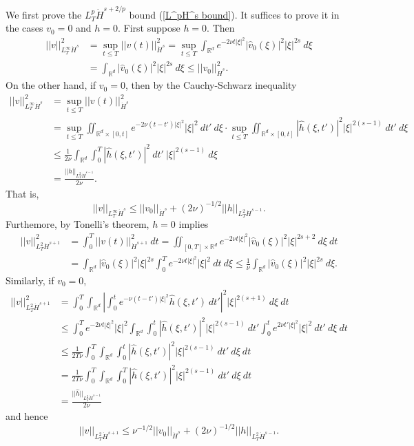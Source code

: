 \documentclass[10pt]{article}
\newcommand{\RR}{\mathbb{R}}
\theoremstyle{definition}
\begin{document}
We first prove the $L^p_T \dot H^{s + 2/p}$ bound (\ref{L^pH^s bound}).
It suffices to prove it in the cases $v_0 = 0$ and $h = 0$.
First suppose $h = 0$. Then
\begin{align*}
||v||_{L^\infty_T \dot H^s}^2 &= \sup_{t \leq T} ||v(t)||_{\dot H^s}^2 = \sup_{t \leq T} \int_{\RR^d} e^{-2\nu t|\xi|^2} |\hat v_0(\xi)|^2 |\xi|^{2s} ~d\xi\\
&= \int_{\RR^d} |\hat v_0(\xi)|^2 |\xi|^{2s} ~d\xi \leq ||v_0||_{\dot H^s}^2.
\end{align*}
On the other hand, if $v_0 = 0$, then by the Cauchy-Schwarz inequality
\begin{align*}
||v||_{L^\infty_T \dot H^s}^2 &= \sup_{t \leq T} ||v(t)||_{\dot H^s}^2\\
&= \sup_{t \leq T} \iint_{\RR^d \times [0, t]} e^{-2\nu(t - t')|\xi|^2} |\xi|^2 ~dt' ~d\xi \cdot \sup_{t \leq T} \iint_{\RR^d \times [0, t]} |\hat h(\xi, t')|^2 |\xi|^{2(s-1)} ~dt' ~d\xi\\
&\leq \frac{1}{2\nu} \int_{\RR^d} \int_0^T |\hat h(\xi, t')|^2 ~dt' ~|\xi|^{2(s-1)} ~d\xi\\
&= \frac{||h||_{L^2_T\dot H^{s-1}}}{2\nu}.
\end{align*}
That is,
\begin{equation}
\label{LpHs right}
||v||_{L^\infty_T \dot H^s} \leq ||v_0||_{\dot H^s} + (2\nu)^{-1/2} ||h||_{L^2_T \dot H^{s-1}}.
\end{equation}
Furthemore, by Tonelli's theorem, $h = 0$ implies
\begin{align*}
||v||_{L^2_T \dot H^{s + 1}}^2 &= \int_0^T ||v(t)||_{\dot H^{s + 1}}^2 ~dt = \iint_{[0, T] \times \RR^d} e^{-2\nu t|\xi|^2} |\hat v_0(\xi)|^2 |\xi|^{2s + 2} ~d\xi ~dt\\
&= \int_{\RR^d} |\hat v_0(\xi)|^2 |\xi|^{2s} \int_0^T e^{-2\nu t|\xi|^2} |\xi|^2 ~dt ~d\xi \leq \frac{1}{\nu} \int_{\RR^d} |\hat v_0(\xi)|^2 |\xi|^{2s} ~d\xi.
\end{align*}
Similarly, if $v_0 = 0$,
\begin{align*}
||v||_{L^2_T \dot H^{s + 1}}^2 &= \int_0^T \int_{\RR^d} \left|\int_0^t e^{-\nu(t - t')|\xi|^2} \hat h(\xi, t') ~dt'\right|^2 |\xi|^{2(s+1)} ~d\xi ~dt\\
&\leq \int_0^T e^{-2\nu t|\xi|^2} |\xi|^2 \int_{\RR^d} \int_0^t |\hat h(\xi, t')|^2 |\xi|^{2(s-1)} ~dt' \int_0^t e^{2\nu t' |\xi|^2} |\xi|^2 ~dt' ~d\xi ~dt\\
&\leq \frac{1}{2T\nu} \int_0^T \int_{\RR^d} \int_0^t |\hat h(\xi, t')|^2 |\xi|^{2(s-1)} ~dt'~d\xi~dt\\
&= \frac{1}{2T\nu} \int_0^T \int_{\RR^d} \int_0^T |\hat h(\xi, t')|^2 |\xi|^{2(s-1)} ~dt'~d\xi~dt\\
&= \frac{||\hat h||_{L^2_T \dot H^{s-1}}}{2\nu}
\end{align*}
and hence
\begin{equation}
\label{LpHs left}
||v||_{L^2_T \dot H^{s + 1}} \leq \nu^{-1/2} ||v_0||_{\dot H^s} + (2\nu)^{-1/2} ||h||_{L^2_T \dot H^{s-1}}.
\end{equation}
\end{document}
